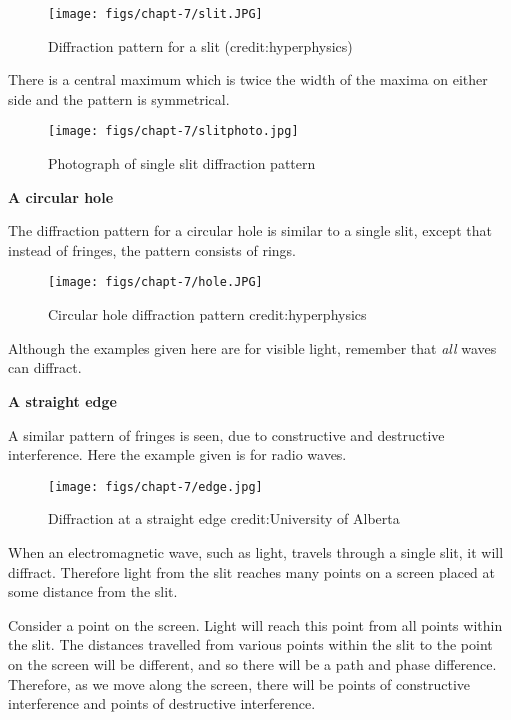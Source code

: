 \documentclass[revision-guide.tex]{subfiles}
\begin{document}
\begin{figure}[h!]
\centering
\texttt{[image: figs/chapt-7/slit.JPG]}
\caption{Diffraction pattern for a slit (credit:hyperphysics)}
\end{figure}

There is a central maximum which is twice the width of the maxima on either side and the pattern is symmetrical.

\begin{figure}[h!]
\centering
\texttt{[image: figs/chapt-7/slitphoto.jpg]}
\caption{Photograph of single slit diffraction pattern}
\end{figure}

\textbf{A circular hole}

The diffraction pattern for a circular hole is similar to a single slit, except that instead of fringes, the pattern consists of rings.

\begin{figure}[h!]
\centering
\texttt{[image: figs/chapt-7/hole.JPG]}
\caption{Circular hole diffraction pattern {credit:hyperphysics}}
\end{figure}

Although the examples given here are for visible light, remember that \emph{all} waves can diffract.

\textbf{A straight edge}

A similar pattern of fringes is seen, due to constructive and destructive interference. Here the example given is for radio waves.

\begin{figure}[h!]
\centering
\texttt{[image: figs/chapt-7/edge.jpg]}
\caption{Diffraction at a straight edge {credit:University of Alberta}}
\end{figure}


When an electromagnetic wave, such as light, travels through a single slit, it will diffract. Therefore light from the slit reaches many points on a screen placed at some distance from the slit.

Consider a point on the screen. Light will reach this point from all points within the slit. The distances travelled from various points within the slit to the point on the screen will be different, and so there will be a path and phase difference. Therefore, as we move along the screen, there will be points of constructive interference and points of destructive interference.
\end{document}
